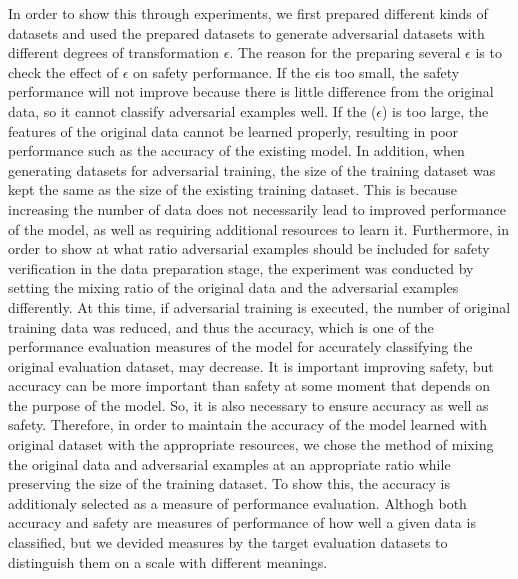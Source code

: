 \documentclass[journal,article,submit,moreauthors,pdftex]{Definitions/mdpi}
\begin{document}
In order to show this through experiments, we first prepared different kinds of datasets and used the prepared datasets to generate adversarial datasets with different degrees of transformation \begin{math}\epsilon\end{math}.
The reason for the preparing several \begin{math}\epsilon\end{math} is to check the effect of \begin{math}\epsilon\end{math} on safety performance. If the \begin{math}\epsilon\end{math}is too small, the safety performance will not improve because there is little difference from the original data, so it cannot classify adversarial examples well. If the (\begin{math}\epsilon\end{math}) is too large, the features of the original data cannot be learned properly, resulting in poor performance such as the accuracy of the existing model.
In addition, when generating datasets for adversarial training, the size of the training dataset was kept the same as the size of the existing training dataset.
This is because increasing the number of data does not necessarily lead to improved performance of the model, as well as requiring additional resources to learn it.
Furthermore, in order to show at what ratio adversarial examples should be included for safety verification in the data preparation stage, the experiment was conducted by setting the mixing ratio of the original data and the adversarial examples differently.
At this time, if adversarial training is executed, the number of original training data was reduced, and thus the accuracy, which is one of the performance evaluation measures of the model for accurately classifying the original evaluation dataset, may decrease.
It is important improving safety, but accuracy can be more important than safety at some moment that depends on the purpose of the model.
So, it is also necessary to ensure accuracy as well as safety. 
Therefore, in order to maintain the accuracy of the model learned with original dataset with the appropriate resources, we chose the method of mixing the original data and adversarial examples at an appropriate ratio while preserving the size of the training dataset.
To show this, the accuracy is additionaly selected as a measure of performance evaluation.
Althogh both accuracy and safety are measures of performance of how well a given data is classified, but we devided measures by the target evaluation datasets to distinguish them on a scale with different meanings.
\end{document}
